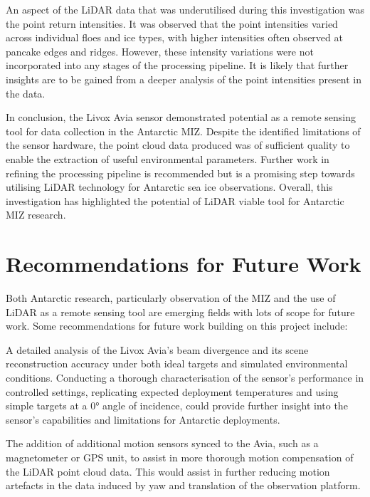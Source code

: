 An aspect of the \ac{LiDAR} data that was underutilised during this investigation was the point return intensities. It was observed that the point intensities varied across individual floes and ice types, with higher intensities often observed at pancake edges and ridges. However, these intensity variations were not incorporated into any stages of the processing pipeline. It is likely that further insights are to be gained from a deeper analysis of the point intensities present in the data.

In conclusion, the Livox Avia sensor demonstrated potential as a remote sensing tool for data collection in the Antarctic \ac{MIZ}. Despite the identified limitations of the sensor hardware, the point cloud data produced was of sufficient quality to enable the extraction of useful environmental parameters. Further work in refining the processing pipeline is recommended but is a promising step towards utilising \ac{LiDAR} technology for Antarctic sea ice observations. Overall, this investigation has highlighted the potential of \ac{LiDAR} viable tool for Antarctic \ac{MIZ} research.

\section{Recommendations for Future Work}
\label{sec:ch9.section2}

Both Antarctic research, particularly observation of the \ac{MIZ} and the use of \ac{LiDAR} as a remote sensing tool are emerging fields with lots of scope for future work. Some recommendations for future work building on this project include:

A detailed analysis of the Livox Avia's beam divergence and its scene reconstruction accuracy under both ideal targets and simulated environmental conditions. Conducting a thorough characterisation of the sensor's performance in controlled settings, replicating expected deployment temperatures and using simple targets at a 0° angle of incidence, could provide further insight into the sensor's capabilities and limitations for Antarctic deployments.

The addition of additional motion sensors synced to the Avia, such as a magnetometer or \ac{GPS} unit, to assist in more thorough motion compensation of the \ac{LiDAR} point cloud data. This would assist in further reducing motion artefacts in the data induced by yaw and translation of the observation platform.

